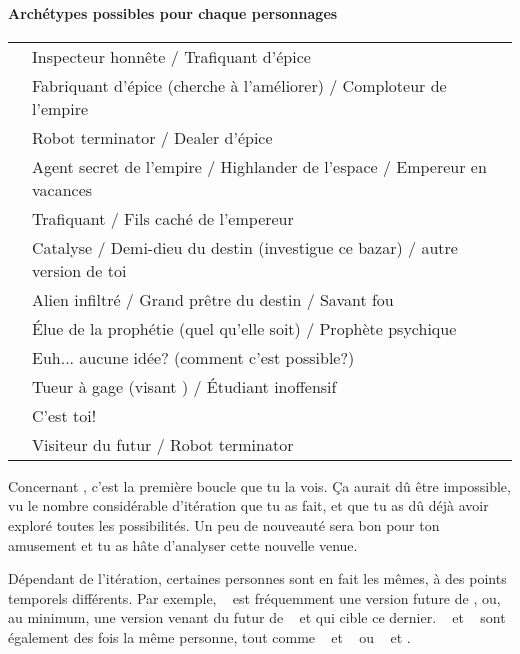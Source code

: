 {	\paragraph{Archétypes possibles pour chaque personnages}
	\begin{center}
	\begin{tabular}{|l||l|}
		\hline
		\emph{\nmPlayerVII} & Inspecteur honnête / Trafiquant d'épice\\
		\emph{\nmPlayerXII} & Fabriquant d'épice (cherche à l'améliorer) / Comploteur de l'empire\\
		\emph{\nmPlayerVIII} & Robot terminator / Dealer d'épice\\
		\emph{\nmPlayerX} & Agent secret de l'empire / Highlander de l'espace / Empereur en vacances\\
		\emph{\nmPlayerII} & Trafiquant / Fils caché de l'empereur\\
		\emph{\nmPlayerXI} & Catalyse / Demi-dieu du destin (investigue ce bazar) / autre version de toi\\
		\emph{\nmPlayerI} & Alien infiltré / Grand prêtre du destin / Savant fou\\
		\emph{\nmPlayerIX} & Élue de la prophétie (quel qu'elle soit) / Prophète psychique\\
		\emph{\nmPlayerVI} & Euh... aucune idée? (comment c'est possible?)\\
		\emph{\nmPlayerIII} & Tueur à gage (visant \nmPlayerX) / Étudiant inoffensif\\
		\emph{\nmPlayerIV} & C'est toi!\\
		\emph{\nmPlayerV} & Visiteur du futur / Robot terminator\\
		\hline
	\end{tabular}
	\end{center}
	\par Concernant \nmPlayerVI, c'est la première boucle que tu la vois. Ça aurait dû être impossible, vu le nombre considérable d'itération que tu as fait, et que tu as dû déjà avoir exploré toutes les possibilités. Un peu de nouveauté sera bon pour ton amusement et tu as hâte d'analyser cette nouvelle venue.
	
	\par Dépendant de l'itération, certaines personnes sont en fait les mêmes, à des points temporels différents. Par exemple, \nmPlayerV ~ est fréquemment une version future de \nmPlayerVII, ou, au minimum, une version venant du futur de \nmPlayerVII ~ et qui cible ce dernier. \nmPlayerII ~ et \nmPlayerIII ~ sont également des fois la même personne, tout comme \nmPlayerX ~ et \nmPlayerVIII ~ ou \nmPlayerXII ~ et \nmPlayerIII.
	
}
